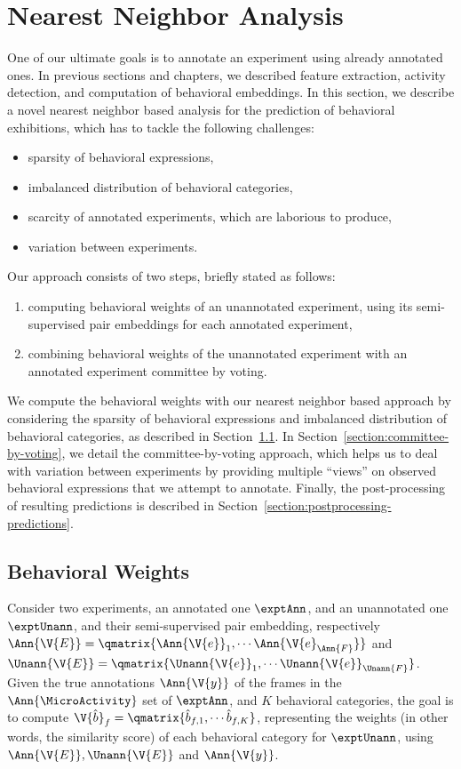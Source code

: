 \section{Nearest Neighbor Analysis}\label{section:nearest-neighbors-analysis}
One of our ultimate goals is to annotate an experiment using already annotated ones.
In previous sections and chapters, we described feature extraction, activity detection, and computation of behavioral embeddings.
In this section, we describe a novel nearest neighbor based analysis for the prediction of behavioral exhibitions, which has to tackle the following challenges:
\begin{itemize}
	\item sparsity of behavioral expressions,
	\item imbalanced distribution of behavioral categories,
	\item scarcity of annotated experiments, which are laborious to produce,
	\item variation between experiments.
\end{itemize}
Our approach consists of two steps, briefly stated as follows:
\begin{enumerate}
	\item computing behavioral weights of an unannotated experiment, using its semi-supervised pair embeddings for each annotated  experiment,
	\item combining behavioral weights of the unannotated experiment with an annotated experiment committee by voting.
\end{enumerate}
We compute the behavioral weights with our nearest neighbor based approach by considering the sparsity of behavioral expressions and imbalanced distribution of behavioral categories, as described in Section~\ref{section:behavioral-weights}.
In Section~\ref{section:committee-by-voting}, we detail the committee-by-voting approach, which helps us to deal with variation between experiments by providing multiple ``views'' on observed behavioral expressions that we attempt to annotate. Finally, the post-processing of resulting predictions is described in Section~\ref{section:postprocessing-predictions}.

\subsection{Behavioral Weights}\label{section:behavioral-weights}
Consider two experiments, an annotated one $\exptAnn$, and an unannotated one $\exptUnann$, and their semi-supervised pair embedding, respectively $\Ann{\V{E}}=\qmatrix{\Ann{\V{e}}_1, \cdots \Ann{\V{e}_{\Ann{F}}}}$ and $\Unann{\V{E}}=\qmatrix{\Unann{\V{e}}_1, \cdots \Unann{\V{e}}_{\Unann{F}}}$.
Given the true annotations $\Ann{\V{y}}$ of the frames in the $\Ann{\MicroActivity}$ set of $\exptAnn$, and $K$ behavioral categories, the goal is to compute $\V{\hat{b}}_f=\qmatrix{\hat{b}_{f,1}, \cdots \hat{b}_{f,K}}$, representing the weights (in other words, the similarity score) of each behavioral category for $\exptUnann$, using $\Ann{\V{E}}, \Unann{\V{E}}$ and $\Ann{\V{y}}$.

